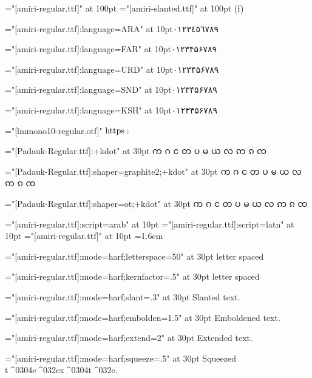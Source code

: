 \btest
\font\testr="[amiri-regular.ttf]" at 100pt
\font\testi="[amiri-slanted.ttf]" at 100pt
\testr ({\testi f\/})
\etest

\btest
\def\l#1#2{%
  \begingroup
  \font\test="[amiri-regular.ttf]:language=#1" at 10pt\test #2%
  \endgroup
}
\l{ARA}{٠١٢٣٤٥٦٧٨٩}\par
\l{FAR}{۰۱۲۳۴۵۶۷۸۹}\par
\l{URD}{۰۱۲۳۴۵۶۷۸۹}\par
\l{SND}{۰۱۲۳۴۵۶۷۸۹}\par
\l{KSH}{۰۱۲۳۴۵۶۷۸۹}\par
\etest

\btest
\font\test="[lmmono10-regular.otf]"\test
$\fam0 \textfont0\font https:$
\etest

\btest
\font\test="[Padauk-Regular.ttf]:+kdot"                  at 30pt\test
က ဂ င တ ပ မ ယ လ ဢ ၵ ၸ \par
\font\test="[Padauk-Regular.ttf]:shaper=graphite2;+kdot" at 30pt\test
က ဂ င တ ပ မ ယ လ ဢ ၵ ၸ \par
\font\test="[Padauk-Regular.ttf]:shaper=ot;+kdot"        at 30pt\test
က ဂ င တ ပ မ ယ လ ဢ ၵ ၸ \par
\etest

\btest
\font\arab="[amiri-regular.ttf]:script=arab" at 10pt\arab
\font\latn="[amiri-regular.ttf]:script=latn" at 10pt\latn
\font\dflt="[amiri-regular.ttf]" at 10pt\dflt
\baselineskip=1.6em
\etest

\btest
\font\test="[amiri-regular.ttf]:mode=harf;letterspace=50" at 30pt\test
letter spaced
\etest

\btest
\font\test="[amiri-regular.ttf]:mode=harf;kernfactor=.5" at 30pt\test
letter spaced
\etest

\btest
\font\test="[amiri-regular.ttf]:mode=harf;slant=.3" at 30pt\test
Slanted text.
\etest

\btest
\font\test="[amiri-regular.ttf]:mode=harf;embolden=1.5" at 30pt\test
Emboldened text.
\etest

\btest
\font\test="[amiri-regular.ttf]:mode=harf;extend=2" at 30pt\test
Extended text.
\etest

\btest
\font\test="[amiri-regular.ttf]:mode=harf;squeeze=.5" at 30pt\test
Squeezed t^^^^0304e^^^^032ex^^^^0304t^^^^032e.
\etest

